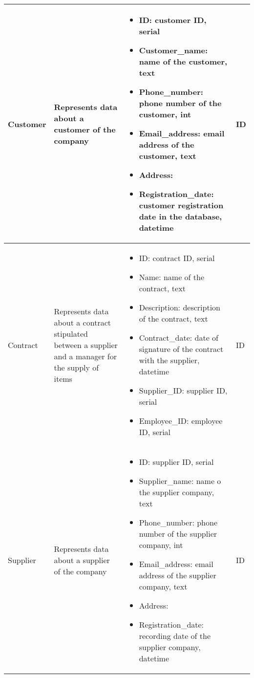 \begin{longtable}{|p{}|p{} |p{}|p{} |}
    Customer & Represents data about a customer of the company &
    \begin{itemize}
        \vspace{-1em}
        \item ID:   customer ID, serial       %
        \item Customer\_name:   name of the customer, text
        \item Phone\_number:   phone number of the customer, int
        \item Email\_address:   email address of the customer, text
        \item Address:   %
        \item Registration\_date:   customer registration date in the database, datetime
    \end{itemize}
    &  ID \\\hline

    Contract & Represents data about a contract stipulated between a supplier and a manager for the supply of items &
    \begin{itemize}
        \vspace{-1em}
        \item ID:   contract ID, serial
        \item Name:   name of the contract, text            %
        \item Description:   description of the contract, text
        \item Contract\_date:    date of signature of the contract with the supplier, datetime
        \item Supplier\_ID:   supplier ID, serial
        \item Employee\_ID:   employee ID, serial
    \end{itemize}
    &  ID \\\hline

    Supplier & Represents data about a supplier of the company &
    \begin{itemize}
        \vspace{-1em}
        \item ID:   supplier ID, serial
        \item Supplier\_name:   name o the supplier company, text
        \item Phone\_number:   phone number of the supplier company, int
        \item Email\_address:   email address of the supplier company, text
        \item Address: %
        \item Registration\_date:   recording date of the supplier company, datetime
    \end{itemize}
    &  ID \\\hline


\end{longtable}
